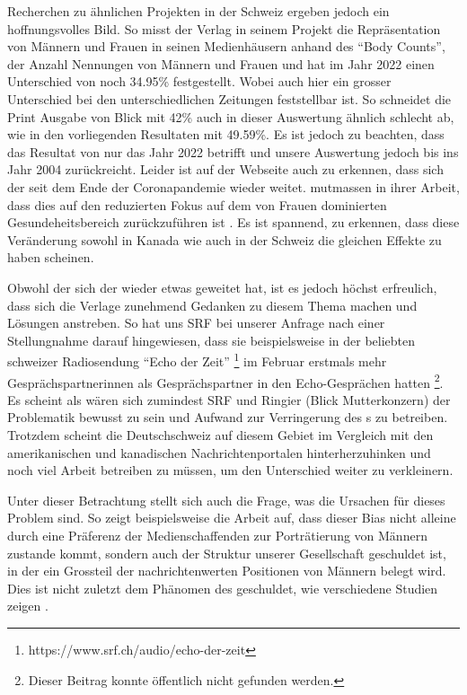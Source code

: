 Recherchen zu ähnlichen Projekten in der Schweiz ergeben jedoch ein hoffnungsvolles Bild. So misst der  Verlag
in seinem Projekt  \cite{ringier-equalvoice} die Repräsentation von Männern und
Frauen in seinen Medienhäusern anhand des \enquote{Body Counts}, der Anzahl Nennungen von Männern und Frauen und hat im
Jahr 2022 einen Unterschied von noch 34.95\% festgestellt. Wobei auch hier ein grosser Unterschied bei den unterschiedlichen Zeitungen
feststellbar ist. So schneidet die Print Ausgabe von Blick mit 42\% auch in dieser Auswertung ähnlich schlecht ab, wie
in den vorliegenden Resultaten mit 49.59\%. Es ist jedoch zu beachten, dass das Resultat von  nur das Jahr 2022
betrifft und unsere Auswertung jedoch bis ins Jahr 2004 zurückreicht. Leider ist auf der Webseite auch zu erkennen, dass
sich der  seit dem Ende der Coronapandemie wieder weitet. \citeauthor{gender_gap_tracker} mutmassen in ihrer Arbeit,
dass dies auf den reduzierten Fokus auf dem von Frauen dominierten Gesundeheitsbereich zurückzuführen ist \cite{gender_gap_tracker}.
Es ist spannend, zu erkennen, dass diese Veränderung sowohl in Kanada wie auch in der Schweiz die gleichen Effekte zu haben scheinen.

Obwohl der sich der  wieder etwas geweitet hat, ist es jedoch höchst erfreulich, dass sich die Verlage zunehmend Gedanken zu diesem Thema machen und Lösungen anstreben.
So hat uns SRF bei unserer Anfrage nach einer Stellungnahme darauf hingewiesen, dass sie beispielsweise in der beliebten schweizer Radiosendung 
\enquote{Echo der Zeit} \footnote{https://www.srf.ch/audio/echo-der-zeit} im Februar erstmals mehr Gesprächspartnerinnen
als Gesprächspartner in den Echo-Gesprächen hatten \footnote{Dieser Beitrag konnte öffentlich nicht gefunden werden.}.
Es scheint als wären sich zumindest SRF und Ringier (Blick Mutterkonzern) der Problematik bewusst zu sein und Aufwand zur
Verringerung des s zu betreiben. Trotzdem scheint die Deutschschweiz auf diesem Gebiet im Vergleich mit
den amerikanischen und kanadischen Nachrichtenportalen hinterherzuhinken und noch viel Arbeit betreiben zu müssen, um
den Unterschied weiter zu verkleinern.

Unter dieser Betrachtung stellt sich auch die Frage, was die Ursachen für dieses Problem sind.
So zeigt beispielsweise die Arbeit  \cite{gender_bias_in_media} auf,
dass dieser Bias nicht alleine durch eine Präferenz der Medienschaffenden zur Porträtierung von Männern zustande kommt,
sondern auch der Struktur unserer Gesellschaft geschuldet ist, in der ein Grossteil der nachrichtenwerten
Positionen von Männern belegt wird. Dies ist nicht zuletzt dem Phänomen des  geschuldet,
wie verschiedene Studien zeigen \cite{glass_ceiling_effect,glass_ceiling_politics}.

